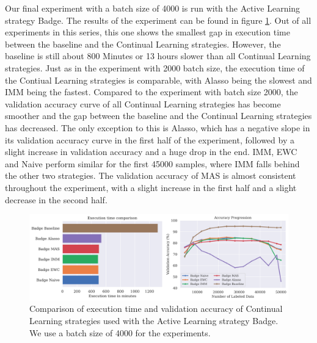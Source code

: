 Our final experiment with a batch size of 4000 is run with the Active Learning strategy Badge. The results of the experiment can be found in figure \ref{fig:Evaluation:Results:CAL:Badge4000}. Out of all experiments in this series, this one shows the
smallest gap in execution time between the baseline and the Continual Learning strategies. However, the baseline is still about 800 Minutes or 13 hours slower than all Continual Learning strategies. Just as in the experiment with 2000 batch size, the
execution time of the Contiual Learning strategies is comparable, with Alasso being the slowest and IMM being the fastest. Compared to the experiment with batch size 2000, the validation accuracy curve of all Continual Learning strategies has become smoother 
and the gap between the baseline and the Continual Learning strategies has decreased. The only exception to this is Alasso, which has a negative slope in its validation accuracy curve in the first half of the experiment, followed by a slight increase in 
validation accuracy and a huge drop in the end. IMM, EWC and Naive perform similar for the first 45000 samples, where IMM falls behind the other two strategies. The validation accuracy of MAS is almost consistent throughout the experiment, with a slight
increase in the first half and a slight decrease in the second half. \par

\begin{figure}[h]
    \centering
    \includegraphics[width=\linewidth]{images/results_CAL/Badge_CAL_4000b.png}
    \caption[Continual Active Learning Badge 4000 batch size]{Comparison of execution time and validation accuracy of Continual Learning strategies used with the Active Learning strategy
    Badge. We use a batch size of 4000 for the experiments.}
    \label{fig:Evaluation:Results:CAL:Badge4000}
\end{figure}

